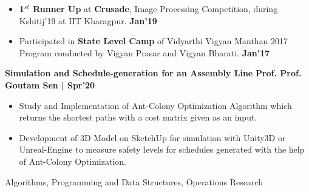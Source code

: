\documentclass[10pt]{article}
\begin{document}
\begin{itemize}[leftmargin=*]
\item \textbf{1$^{st}$ Runner Up} at \textbf{Crusade}, Image Processing Competition, during Kshitij'19 at IIT Kharagpur.  {\hfill}\textbf{Jan'19}\\[-1.8em]
\item Participated in \textbf{State Level Camp} of Vidyarthi Vigyan Manthan 2017 Program conducted by Vigyan Prasar and Vigyan Bharati. {\hfill}\textbf{Jan'17}\\[-1.8em]
\end{itemize}

\spacedhrule{0.15ex}{1.0ex}
\large {\textbf{Simulation and Schedule-generation for an Assembly Line}} \normalsize  \iffalse \href{https://github.com/harsh639/GeneticAlgorithm} {\hspace{0.5ex}\faGithub}\fi {\hfill} \textbf{Prof. Prof. Goutam Sen | Spr'20}\\[-1.75em]
\begin{itemize}
\item Study and Implementation of Ant-Colony Optimization Algorithm which returns the shortest paths with a cost matrix given as an input.\\[-1.8em]
\item Development of 3D Model on SketchUp for simulation with Unity3D or Unreal-Engine to measure safety levels for schedules generated with the help of Ant-Colony Optimization.\\[-1.8em]
\end{itemize}
\vspace{-0.6ex}
\spacedhrule{0.15ex}{1.0ex}
\begin{indentsection}
	{Algorithms, Programming and Data Structures, Operations Research }\\[-1em]
\end{indentsection}
\end{document}
